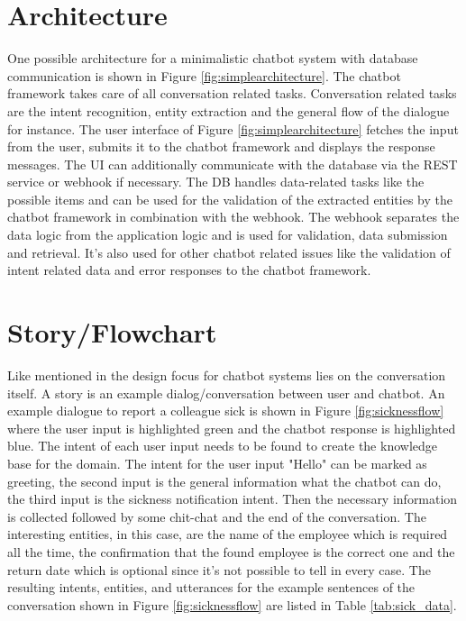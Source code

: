 \section{Architecture}

One possible architecture for a minimalistic chatbot system with database communication is shown in Figure \ref{fig:simplearchitecture}.
The chatbot framework takes care of all conversation related tasks. 
Conversation related tasks are the intent recognition, entity extraction and the general flow of the dialogue for instance. 
The user interface of Figure \ref{fig:simplearchitecture} fetches the input from the user, submits it to the chatbot framework 
and displays the response messages. 
The UI can additionally communicate with the database via the REST service or webhook if necessary.
The DB handles data-related tasks like the possible items and can be used for the validation of the extracted entities
 by the chatbot framework in combination with the webhook. 
 The webhook separates the data logic from the application logic and is used for validation, 
 data submission and retrieval.
 It's also used for other chatbot related issues like the validation of intent related data and error responses to the chatbot framework.

 \section{Story/Flowchart}
 
 Like mentioned in \citet{folstad2017chatbots} the design focus for chatbot systems lies on the conversation itself.
 A story is an example dialog/conversation between user and chatbot. 
 An example dialogue to report a colleague sick is shown in Figure \ref{fig:sicknessflow} 
 where the user input is highlighted green and the chatbot response is highlighted blue.
 The intent of each user input needs to be found to create the knowledge base for the domain. 
 The intent for the user input "Hello" can be marked as greeting, the second input is the general information what the chatbot can do, 
 the third input is the sickness notification intent. Then the necessary information is collected followed by some chit-chat and the end of the conversation. 
 The interesting entities, in this case, are the name of the employee which is required all the time, the confirmation that the found employee is the 
 correct one and the return date which is optional since it's not possible to tell in every case. 
 The resulting intents, entities, and utterances for the example sentences of the conversation 
 shown in Figure \ref{fig:sicknessflow} are listed in Table \ref{tab:sick_data}.
 
